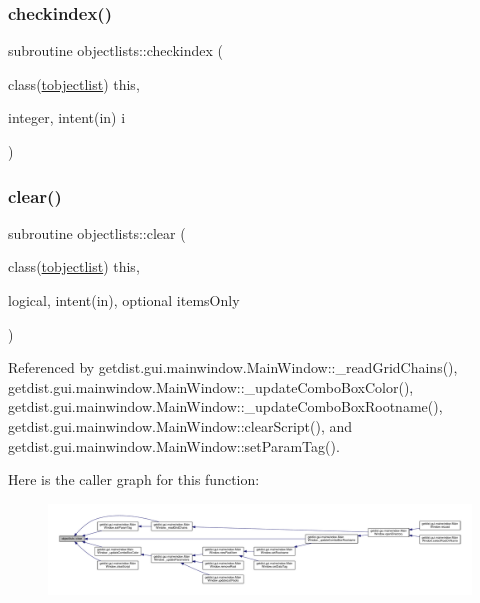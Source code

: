 \mbox{\label{namespaceobjectlists_aff0608d072ab891a55072d2afde0b978}} 
\subsubsection{\texorpdfstring{checkindex()}{checkindex()}}
{\footnotesize\ttfamily subroutine objectlists\+::checkindex (\begin{DoxyParamCaption}\item[{class(\mbox{\hyperlink{structobjectlists_1_1tobjectlist}{tobjectlist}})}]{this,  }\item[{integer, intent(in)}]{i }\end{DoxyParamCaption})\hspace{0.3cm}{\ttfamily [private]}}

\mbox{\label{namespaceobjectlists_af7dd3c43a123562bc92cf38d6ed508cd}} 
\subsubsection{\texorpdfstring{clear()}{clear()}}
{\footnotesize\ttfamily subroutine objectlists\+::clear (\begin{DoxyParamCaption}\item[{class(\mbox{\hyperlink{structobjectlists_1_1tobjectlist}{tobjectlist}})}]{this,  }\item[{logical, intent(in), optional}]{items\+Only }\end{DoxyParamCaption})\hspace{0.3cm}{\ttfamily [private]}}



Referenced by getdist.\+gui.\+mainwindow.\+Main\+Window\+::\+\_\+read\+Grid\+Chains(), getdist.\+gui.\+mainwindow.\+Main\+Window\+::\+\_\+update\+Combo\+Box\+Color(), getdist.\+gui.\+mainwindow.\+Main\+Window\+::\+\_\+update\+Combo\+Box\+Rootname(), getdist.\+gui.\+mainwindow.\+Main\+Window\+::clear\+Script(), and getdist.\+gui.\+mainwindow.\+Main\+Window\+::set\+Param\+Tag().

Here is the caller graph for this function\+:
\nopagebreak
\begin{figure}[H]
\begin{center}
\leavevmode
\includegraphics[width=350pt]{namespaceobjectlists_af7dd3c43a123562bc92cf38d6ed508cd_icgraph}
\end{center}
\end{figure}
\mbox{\label{namespaceobjectlists_a05b2014389dbbc09da541c24912141f8}} 
